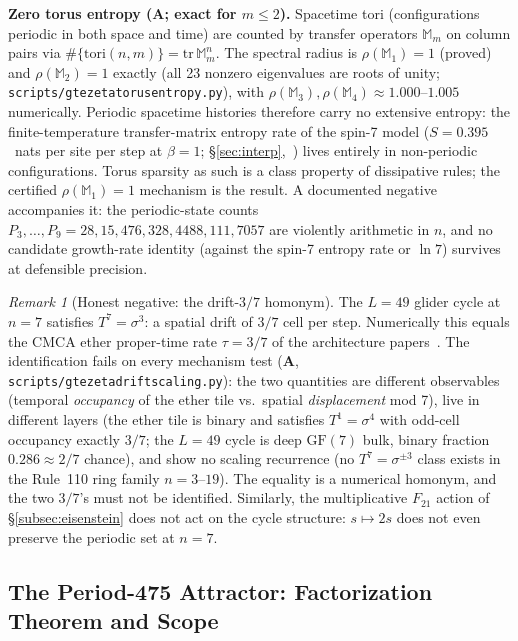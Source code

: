 \documentclass[11pt]{article}
\theoremstyle{remark}
\newtheorem{remark}[theorem]{Remark}
\newcommand{\GF}[1]{\ensuremath{\mathrm{GF}(#1)}}
\newcommand{\lean}[1]{%
  \penalty-100
  \begingroup\def\_{\textunderscore\allowbreak}\texttt{#1}\endgroup}
\newcommand{\CatA}{\textbf{A}}
\begin{document}
\medskip
\noindent\textbf{Zero torus entropy (\CatA{}; exact for $m \leq 2$).}
Spacetime tori (configurations periodic in both space and time) are
counted by transfer operators $\mathbb{M}_m$ on column pairs via
$\#\{\text{tori}(n,m)\} = \mathrm{tr}\,\mathbb{M}_m^n$. The spectral
radius is $\rho(\mathbb{M}_1) = 1$ (proved) and $\rho(\mathbb{M}_2) = 1$
exactly (all 23 nonzero eigenvalues are roots of unity;
\lean{scripts/gte\_zeta\_torus\_entropy.py}), with
$\rho(\mathbb{M}_3), \rho(\mathbb{M}_4) \approx 1.000$--$1.005$
numerically. Periodic spacetime histories therefore carry no extensive
entropy: the finite-temperature transfer-matrix entropy rate of
the spin-7 model ($S = 0.395$~nats per site per step at $\beta = 1$;
§\ref{sec:interp},~\cite{SpivackSpin7Lattice}) lives
entirely in non-periodic configurations. Torus sparsity as such is a class
property of dissipative rules; the certified $\rho(\mathbb{M}_1) = 1$
mechanism is the result. A documented negative accompanies it: the
periodic-state counts $P_3, \ldots, P_9 = 28, 15, 476, 328, 4488, 111,
7057$ are violently arithmetic in $n$, and no candidate growth-rate
identity (against the spin-7 entropy rate or $\ln 7$) survives at
defensible precision.

\begin{remark}[Honest negative: the drift-$3/7$ homonym]
\label{rem:drift37}
The $L = 49$ glider cycle at $n = 7$ satisfies $T^7 = \sigma^3$: a spatial
drift of $3/7$ cell per step. Numerically this equals the CMCA ether
proper-time rate $\tau = 3/7$ of the architecture
papers~\cite{SpivackThreeTapeCMCA}. The identification fails on every
mechanism test (\CatA{},
\lean{scripts/gte\_zeta\_drift\_scaling.py}): the two quantities are
different observables (temporal \emph{occupancy} of the ether tile vs.\
spatial \emph{displacement} mod 7), live in different layers (the ether
tile is binary and satisfies $T^1 = \sigma^4$ with odd-cell occupancy
exactly $3/7$; the $L = 49$ cycle is deep $\GF{7}$ bulk, binary fraction
$0.286 \approx 2/7$ chance), and show no scaling recurrence (no
$T^7 = \sigma^{\pm 3}$ class exists in the Rule~110 ring family
$n = 3$--$19$). The equality is a numerical homonym, and the two $3/7$'s
must not be identified. Similarly, the multiplicative $F_{21}$ action of
§\ref{subsec:eisenstein} does not act on the cycle structure: $s \mapsto
2s$ does not even preserve the periodic set at $n = 7$.
\end{remark}

\subsection{The Period-475 Attractor: Factorization Theorem and Scope}
\label{subsec:attractor-factorization}
\end{document}
